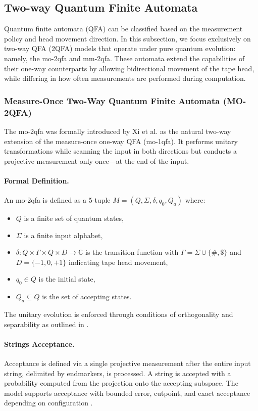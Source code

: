 \subsection{Two-way Quantum Finite Automata}
\label{sec:2-way-qfa}

Quantum finite automata (QFA) can be classified based on the measurement policy and head movement direction. In this subsection, we focus exclusively on two-way QFA (2QFA) models that operate under pure quantum evolution: namely, the \gls{mo-2qfa} and \gls{mm-2qfa}. These automata extend the capabilities of their one-way counterparts by allowing bidirectional movement of the tape head, while differing in how often measurements are performed during computation.

\subsubsection{Measure-Once Two-Way Quantum Finite Automata (MO-2QFA)}

The \gls{mo-2qfa} was formally introduced by Xi et al. \cite{xi2008some} as the natural two-way extension of the measure-once one-way QFA (\gls{mo-1qfa}). It performs unitary transformations while scanning the input in both directions but conducts a projective measurement only once—at the end of the input.

\paragraph{Formal Definition.} An \gls{mo-2qfa} is defined as a 5-tuple $M = (Q, \Sigma, \delta, q_0, Q_a)$ where:
\begin{itemize}
    \item $Q$ is a finite set of quantum states,
    \item $\Sigma$ is a finite input alphabet,
    \item $\delta: Q \times \Gamma \times Q \times D \to \mathbb{C}$ is the transition function with $\Gamma = \Sigma \cup \{\#, \$\}$ and $D = \{-1, 0, +1\}$ indicating tape head movement,
    \item $q_0 \in Q$ is the initial state,
    \item $Q_a \subseteq Q$ is the set of accepting states.
\end{itemize}
The unitary evolution is enforced through conditions of orthogonality and separability as outlined in \cite{xi2008some}.

\paragraph{Strings Acceptance.} Acceptance is defined via a single projective measurement after the entire input string, delimited by endmarkers, is processed. A string is accepted with a probability computed from the projection onto the accepting subspace. The model supports acceptance with bounded error, cutpoint, and exact acceptance depending on configuration \cite{xi2008some}.

